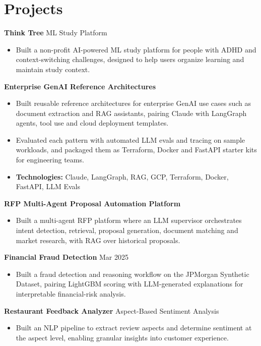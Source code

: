 \documentclass[10pt,a4paper]{article}
\begin{document}
\section{Projects}
\textbf{Think Tree} \textbar{} ML Study Platform\par
\begin{itemize}
  \item Built a non-profit AI-powered ML study platform for people with ADHD and context-switching challenges, designed to help users organize learning and maintain study context.
\end{itemize}
\textbf{Enterprise GenAI Reference Architectures}\par
\begin{itemize}
  \item Built reusable reference architectures for enterprise GenAI use cases such as document extraction and RAG assistants, pairing Claude with LangGraph agents, tool use and cloud deployment templates.
  \item Evaluated each pattern with automated LLM evals and tracing on sample workloads, and packaged them as Terraform, Docker and FastAPI starter kits for engineering teams.
  \item \textbf{Technologies:} Claude, LangGraph, RAG, GCP, Terraform, Docker, FastAPI, LLM Evals
\end{itemize}
\textbf{RFP Multi-Agent Proposal Automation Platform}\par
\begin{itemize}
  \item Built a multi-agent RFP platform where an LLM supervisor orchestrates intent detection, retrieval, proposal generation, document matching and market research, with RAG over historical proposals.
\end{itemize}
\textbf{Financial Fraud Detection} \textbar{} Mar 2025\par
\begin{itemize}
  \item Built a fraud detection and reasoning workflow on the JPMorgan Synthetic Dataset, pairing LightGBM scoring with LLM-generated explanations for interpretable financial-risk analysis.
\end{itemize}
\textbf{Restaurant Feedback Analyzer} \textbar{} Aspect-Based Sentiment Analysis\par
\begin{itemize}
  \item Built an NLP pipeline to extract review aspects and determine sentiment at the aspect level, enabling granular insights into customer experience.
\end{itemize}
\end{document}
